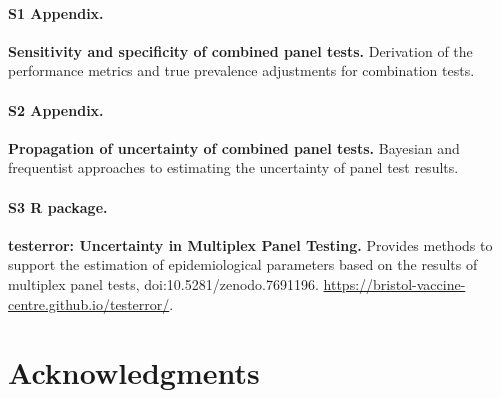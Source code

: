 \documentclass[10pt,letterpaper]{article}
\begin{document}

\paragraph*{S1 Appendix.}
\label{S1_Appendix}
{\bf Sensitivity and specificity of combined panel tests.} Derivation of the performance metrics and true prevalence adjustments for combination tests.

\paragraph*{S2 Appendix.}
\label{S2_Appendix}
{\bf Propagation of uncertainty of combined panel tests.} Bayesian and frequentist approaches to estimating the uncertainty of panel test results.

\paragraph*{S3 R package.}
\label{S3_Github}
{\bf testerror: Uncertainty in Multiplex Panel Testing.}  Provides methods to support the estimation of epidemiological parameters based on the results of multiplex panel tests, doi:10.5281/zenodo.7691196. \url{https://bristol-vaccine-centre.github.io/testerror/}.




\section*{Acknowledgments}


\nolinenumbers
\end{document}
